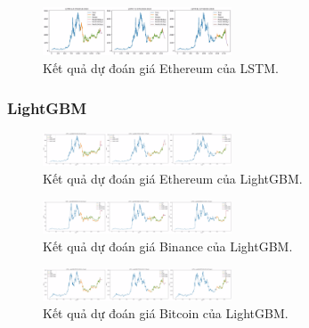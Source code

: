 \documentclass[conference]{IEEEtran}
\begin{document}
\begin{figure}[H]
    \centering
    \includegraphics[width=0.5\textwidth]{bibliography/pictures/LSTM ETH.jpg}
    \caption{Kết quả dự đoán giá Ethereum của LSTM.}
\end{figure}


\subsubsection{LightGBM}
\begin{figure}[H]
    \centering
    \includegraphics[width=0.5\textwidth]{bibliography/pictures/ETH LightGBM.jpg}
    \caption{Kết quả dự đoán giá Ethereum của LightGBM.}
\end{figure}
\begin{figure}[H]
    \centering
    \includegraphics[width=0.5\textwidth]{bibliography/pictures/BNB LightGBM.jpg}
    \caption{Kết quả dự đoán giá Binance của LightGBM.}
\end{figure}
\begin{figure}[H]
    \centering
    \includegraphics[width=0.5\textwidth]{bibliography/pictures/BTC LightGBM.jpg}
    \caption{Kết quả dự đoán giá Bitcoin của LightGBM.}
\end{figure}
\end{document}
